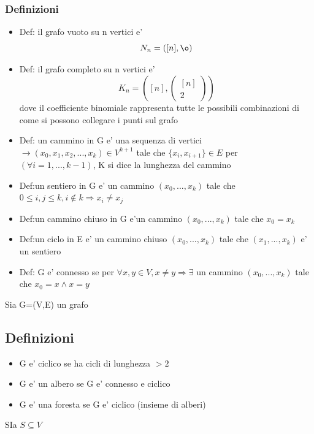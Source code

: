 \documentclass{article}
\begin{document}
        \subsubsection*{Definizioni}
        \begin{itemize}
          \item Def: il grafo vuoto su n vertici e'
            \begin{equation*}
              N_n=([n],\o)
            \end{equation*}
          \item Def: il grafo completo su n vertici e'
            \begin{equation*}
              K_n=([n],\begin{pmatrix}
                [n] \\ 2
              \end{pmatrix})
            \end{equation*} dove il coefficiente binomiale rappresenta tutte le possibili combinazioni di come si possono collegare i punti sul grafo
          \item Def: un cammino in G e' una sequenza di vertici $\to (x_0,x_1,x_2,...,x_k)\in V^{k+1}$ tale che $\{x_i,x_{i+1}\}\in E$ per $(\forall i=1,...,k-1)$,
            K si dice la lunghezza del cammino
          \item Def:un sentiero in G e' un cammino $(x_0,...,x_k)$ tale che $0\leq i, j\leq k,i \notin k \Rightarrow x_i \neq x_j$
          \item Def:un cammino chiuso in G e'un cammino $(x_0,...,x_k)$ tale che $x_0=x_k$
          \item Def:un ciclo in E e' un cammino chiuso $(x_0,...,x_k)$ tale che $(x_1,...,x_k)$ e' un sentiero
          \item Def: G e' connesso se per $\forall x,y \in V, x\neq y \Rightarrow \exists$ un cammino $(x_0,...,x_k)$ tale che $x_0=x \land x=y$
        \end{itemize}
        \begin{flushleft}
          Sia G=(V,E) un grafo
        \end{flushleft}
        \subsection*{Definizioni}
        \begin{itemize}
          \item G e' ciclico se ha cicli di lunghezza $>2$
          \item G e' un albero se G e' connesso e ciclico
          \item G e' una foresta se G e' ciclico (insieme di alberi)
        \end{itemize}
        \begin{flushleft}
          SIa $S \subseteq V$
        \end{flushleft}
\end{document}

